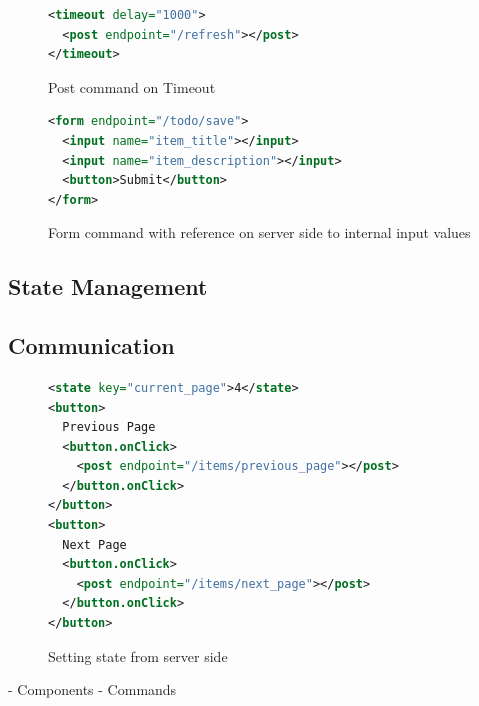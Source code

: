 \begin{figure}
\begin{minipage}{\linewidth}
\begin{lstlisting}[language=xml]
<timeout delay="1000">
  <post endpoint="/refresh"></post>
</timeout>
\end{lstlisting}
\end{minipage}
\caption{Post command on Timeout}%
\label{fig:ex_cmd_post_timeout}%
\end{figure}

\begin{figure}
\begin{minipage}{\linewidth}
\begin{lstlisting}[language=xml]
<form endpoint="/todo/save">
  <input name="item_title"></input>
  <input name="item_description"></input>
  <button>Submit</button>
</form>
\end{lstlisting}
\end{minipage}
\caption{Form command with reference on server side to internal input values}%
\label{fig:ex_cmd_form}%
\end{figure}

\subsection{State Management}

\subsection{Communication}



\begin{figure}
\begin{minipage}{\linewidth}
\begin{lstlisting}[language=xml]
<state key="current_page">4</state>
<button>
  Previous Page
  <button.onClick>
    <post endpoint="/items/previous_page"></post>
  </button.onClick>
</button>
<button>
  Next Page
  <button.onClick>
    <post endpoint="/items/next_page"></post>
  </button.onClick>
</button>
\end{lstlisting}
\end{minipage}
\caption{Setting state from server side}%
\label{fig:ex_cmd_post_state}%
\end{figure}



- Components
- Commands